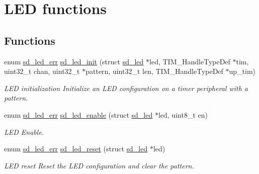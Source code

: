 \hypertarget{group___s_d___l_e_d___functions}{}\section{L\+ED functions}
\label{group___s_d___l_e_d___functions}
\subsection*{Functions}
\begin{DoxyCompactItemize}
\item 
enum \mbox{\hyperlink{group___s_d___l_e_d___types_ga4f347a1003b4089de88a7f0fc62c1071}{sd\+\_\+led\+\_\+err}} \mbox{\hyperlink{group___s_d___l_e_d___functions_ga06e51b91e36bfe8becb0e977ae6d9035}{sd\+\_\+led\+\_\+init}} (struct \mbox{\hyperlink{structsd__led}{sd\+\_\+led}} $\ast$led, T\+I\+M\+\_\+\+Handle\+Type\+Def $\ast$tim, uint32\+\_\+t chan, uint32\+\_\+t $\ast$pattern, uint32\+\_\+t len, T\+I\+M\+\_\+\+Handle\+Type\+Def $\ast$up\+\_\+tim)
\begin{DoxyCompactList}\small\item\em L\+ED initialization Initialize an L\+ED configuration on a timer peripheral with a pattern. \end{DoxyCompactList}\item 
\mbox{\label{group___s_d___l_e_d___functions_ga4e236adfeac9570724de7a61dc89324d}} 
enum \mbox{\hyperlink{group___s_d___l_e_d___types_ga4f347a1003b4089de88a7f0fc62c1071}{sd\+\_\+led\+\_\+err}} \mbox{\hyperlink{group___s_d___l_e_d___functions_ga4e236adfeac9570724de7a61dc89324d}{sd\+\_\+led\+\_\+enable}} (struct \mbox{\hyperlink{structsd__led}{sd\+\_\+led}} $\ast$led, uint8\+\_\+t en)
\begin{DoxyCompactList}\small\item\em L\+ED Enable. \end{DoxyCompactList}\item 
enum \mbox{\hyperlink{group___s_d___l_e_d___types_ga4f347a1003b4089de88a7f0fc62c1071}{sd\+\_\+led\+\_\+err}} \mbox{\hyperlink{group___s_d___l_e_d___functions_ga1a7bb12d105f503fec86d069725f6591}{sd\+\_\+led\+\_\+reset}} (struct \mbox{\hyperlink{structsd__led}{sd\+\_\+led}} $\ast$led)
\begin{DoxyCompactList}\small\item\em L\+ED reset Reset the L\+ED configuration and clear the pattern. \end{DoxyCompactList}\item 

\end{DoxyCompactItemize}
